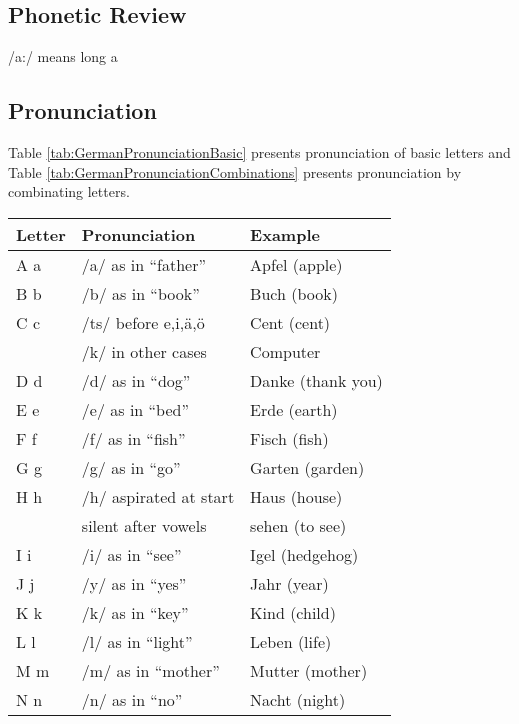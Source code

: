 \subsection{Phonetic Review}\label{subsec:phoneticReview}

/a:/ means long a

\subsection{Pronunciation}\label{subsec:pronunciation}

Table \ref{tab:GermanPronunciationBasic} presents pronunciation of basic letters and Table \ref{tab:GermanPronunciationCombinations} presents pronunciation by combinating letters.

\begin{table}[H]
    \centering
    \begin{tabular}{|l|l|l|}
    \hline
    \textbf{Letter} & \textbf{Pronunciation} & \textbf{Example} \\
    \hline
    A a & /a/ as in ``father'' & Apfel (apple) \\
    \hline
    B b & /b/ as in ``book'' & Buch (book) \\
    \hline
    C c & /ts/ before e,i,\"{a},\"{o} & Cent (cent) \\
        & /k/ in other cases & Computer \\
    \hline
    D d & /d/ as in ``dog'' & Danke (thank you) \\
    \hline
    E e & /e/ as in ``bed'' & Erde (earth) \\
    \hline
    F f & /f/ as in ``fish'' & Fisch (fish) \\
    \hline
    G g & /g/ as in ``go'' & Garten (garden) \\
    \hline
    H h & /h/ aspirated at start & Haus (house) \\
        & silent after vowels & sehen (to see) \\
    \hline
    I i & /i/ as in ``see'' & Igel (hedgehog) \\
    \hline
    J j & /y/ as in ``yes'' & Jahr (year) \\
    \hline
    K k & /k/ as in ``key'' & Kind (child) \\
    \hline
    L l & /l/ as in ``light'' & Leben (life) \\
    \hline
    M m & /m/ as in ``mother'' & Mutter (mother) \\
    \hline
    N n & /n/ as in ``no'' & Nacht (night) \\

\end{tabular}
\end{table}
